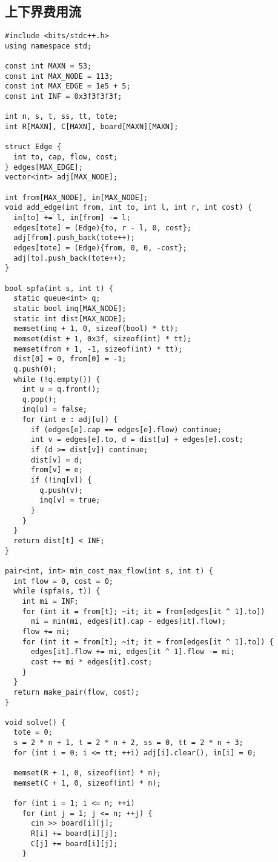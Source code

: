 \documentclass[twoside]{article}
\begin{document}
\subsection{上下界费用流}
\begin{lstlisting}
#include <bits/stdc++.h>
using namespace std;

const int MAXN = 53;
const int MAX_NODE = 113;
const int MAX_EDGE = 1e5 + 5;
const int INF = 0x3f3f3f3f;

int n, s, t, ss, tt, tote;
int R[MAXN], C[MAXN], board[MAXN][MAXN];

struct Edge {
  int to, cap, flow, cost;
} edges[MAX_EDGE];
vector<int> adj[MAX_NODE];

int from[MAX_NODE], in[MAX_NODE];
void add_edge(int from, int to, int l, int r, int cost) {
  in[to] += l, in[from] -= l;
  edges[tote] = (Edge){to, r - l, 0, cost};
  adj[from].push_back(tote++);
  edges[tote] = (Edge){from, 0, 0, -cost};
  adj[to].push_back(tote++);
}

bool spfa(int s, int t) {
  static queue<int> q;
  static bool inq[MAX_NODE];
  static int dist[MAX_NODE];
  memset(inq + 1, 0, sizeof(bool) * tt);
  memset(dist + 1, 0x3f, sizeof(int) * tt);
  memset(from + 1, -1, sizeof(int) * tt);
  dist[0] = 0, from[0] = -1;
  q.push(0);
  while (!q.empty()) {
    int u = q.front();
    q.pop();
    inq[u] = false;
    for (int e : adj[u]) {
      if (edges[e].cap == edges[e].flow) continue;
      int v = edges[e].to, d = dist[u] + edges[e].cost;
      if (d >= dist[v]) continue;
      dist[v] = d;
      from[v] = e;
      if (!inq[v]) {
        q.push(v);
        inq[v] = true;
      }
    }
  }
  return dist[t] < INF;
}

pair<int, int> min_cost_max_flow(int s, int t) {
  int flow = 0, cost = 0;
  while (spfa(s, t)) {
    int mi = INF;
    for (int it = from[t]; ~it; it = from[edges[it ^ 1].to])
      mi = min(mi, edges[it].cap - edges[it].flow);
    flow += mi;
    for (int it = from[t]; ~it; it = from[edges[it ^ 1].to]) {
      edges[it].flow += mi, edges[it ^ 1].flow -= mi;
      cost += mi * edges[it].cost;
    }
  }
  return make_pair(flow, cost);
}

void solve() {
  tote = 0;
  s = 2 * n + 1, t = 2 * n + 2, ss = 0, tt = 2 * n + 3;
  for (int i = 0; i <= tt; ++i) adj[i].clear(), in[i] = 0;

  memset(R + 1, 0, sizeof(int) * n);
  memset(C + 1, 0, sizeof(int) * n);

  for (int i = 1; i <= n; ++i)
    for (int j = 1; j <= n; ++j) {
      cin >> board[i][j];
      R[i] += board[i][j];
      C[j] += board[i][j];
    }


\end{lstlisting}
\end{document}
